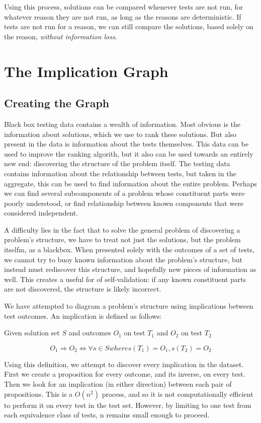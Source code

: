 \documentclass[11pt,twoside]{article}
\begin{document}
Using this process, solutions can be compared whenever tests are not run, for whatever reason they are not run, as long as the reasons are deterministic. If tests are not run for a reason, we can still compare the solutions, based solely on the reason, \emph{without information loss}.

\section{The Implication Graph}
\subsection{Creating the Graph}
Black box testing data contains a wealth of information. Most obvious is the information about solutions, which we use to rank these solutions. But also present in the data is information about the tests themselves. This data can be used to improve the ranking algorith, but it also can be used towards an entirely new end: discovering the structure of the problem itself. The testing data contains information about the relationship between tests, but taken in the aggregate, this can be used to find information about the entire problem. Perhaps we can find several subcomponents of a problem whose constituent parts were poorly understood, or find relationship between known components that were considered independent.

A difficulty lies in the fact that to solve the general problem of discovering a problem's structure, we have to treat not just the solutions, but the problem itselfm, as a blackbox. When presented solely with the outcomes of a set of tests, we cannot try to buoy known information about the problem's structure, but instead must rediscover this structure, and hopefully new pieces of information as well. This creates a useful for of self-validation: if any known constituent parts are not discovered, the structure is likely incorrect.

We have attempted to diagram a problem's structure using implications between test outcomes. An implication is defined as follows:

\centerline{Given solution set $S$ and outcomes $O_1$ on test $T_1$ and $O_2$ on test $T_2$}
$$O_1 \Rightarrow O_2 \iff \forall s \in S where s(T_1) = O_1, s(T_2) = O_2$$

Using this definition, we attempt to discover every implication in the dataset. First we create a proposition for every outcome, and its inverse, on every test. Then we look for an implication (in either direction) between each pair of propositions. This is a $O(n^2)$ process, and so it is not computationally efficient to perform it on every test in the test set. However, by limiting to one test from each equivalence class of tests, n remains small enough to proceed.
\end{document}
